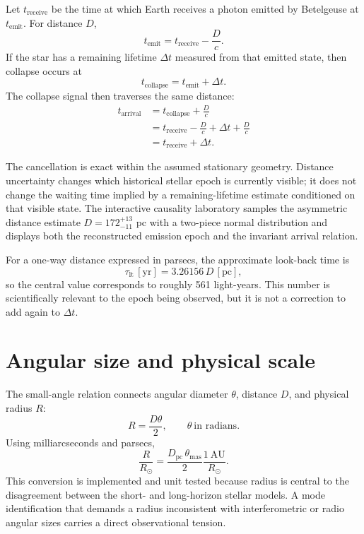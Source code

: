 \documentclass[11pt,a4paper]{article}
\newcommand{\Rsun}{R_{\odot}}
\begin{document}
Let $t_{\mathrm{receive}}$ be the time at which Earth receives a photon emitted by Betelgeuse at $t_{\mathrm{emit}}$. For distance $D$,
\begin{equation}
t_{\mathrm{emit}} = t_{\mathrm{receive}} - \frac{D}{c}.
\end{equation}
If the star has a remaining lifetime $\Delta t$ measured from that emitted state, then collapse occurs at
\begin{equation}
t_{\mathrm{collapse}} = t_{\mathrm{emit}} + \Delta t.
\end{equation}
The collapse signal then traverses the same distance:
\begin{align}
t_{\mathrm{arrival}}
  &= t_{\mathrm{collapse}} + \frac{D}{c} \\
  &= t_{\mathrm{receive}} - \frac{D}{c} + \Delta t + \frac{D}{c} \\
  &= \boxed{t_{\mathrm{receive}} + \Delta t}.
\end{align}

The cancellation is exact within the assumed stationary geometry. Distance uncertainty changes which historical stellar epoch is currently visible; it does not change the waiting time implied by a remaining-lifetime estimate conditioned on that visible state. The interactive causality laboratory samples the asymmetric distance estimate $D=172^{+13}_{-11}$ pc with a two-piece normal distribution and displays both the reconstructed emission epoch and the invariant arrival relation.

For a one-way distance expressed in parsecs, the approximate look-back time is
\begin{equation}
\tau_{\mathrm{lt}}\,[\mathrm{yr}] = 3.26156\,D\,[\mathrm{pc}],
\end{equation}
so the central value corresponds to roughly 561 light-years. This number is scientifically relevant to the epoch being observed, but it is not a correction to add again to $\Delta t$.

\section{Angular size and physical scale}

The small-angle relation connects angular diameter $\theta$, distance $D$, and physical radius $R$:
\begin{equation}
R = \frac{D\theta}{2}, \qquad \theta\ \text{in radians}.
\end{equation}
Using milliarcseconds and parsecs,
\begin{equation}
\frac{R}{\Rsun} = \frac{D_{\mathrm{pc}}\,\theta_{\mathrm{mas}}}{2}
\frac{1\ \mathrm{AU}}{\Rsun}.
\end{equation}
This conversion is implemented and unit tested because radius is central to the disagreement between the short- and long-horizon stellar models. A mode identification that demands a radius inconsistent with interferometric or radio angular sizes carries a direct observational tension.
\end{document}
